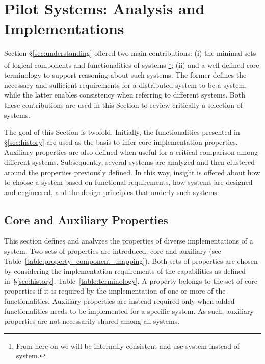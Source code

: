 \documentclass{sig-alternate}
\begin{document}
\section{Pilot Systems: Analysis and Implementations}
\label{sec:analysis}

Section \S\ref{sec:understanding} offered two main contributions: (i) the
minimal sets of logical components and functionalities of \pilot systems
\footnote{ From here on we will be internally consistent and use \pilot system
instead of \pilotjob system.}; (ii) and a well-defined core terminology to
support reasoning about such systems. The former defines the necessary and
sufficient requirements for a distributed system to be a \pilot system, while
the latter enables consistency when referring to different \pilot systems. Both
these contributions are used in this Section to review critically a selection
of \pilot systems.

The goal of this Section is twofold. Initially, the \pilot functionalities
presented in \S\ref{sec:history} are used as the basis to infer core \pilot
implementation properties. Auxiliary properties are also defined when useful
for a critical comparison among different \pilot systems. Subsequently, several
\pilot systems are analyzed and then clustered around the properties previously
defined. In this way, insight is offered about how to choose a \pilot system
based on functional requirements, how \pilot systems are designed and
engineered, and the design principles that underly such systems.

%
\subsection{Core and Auxiliary Properties}
\label{sec:properties}

This section defines and analyzes the properties of diverse implementations of
a \pilot system. Two sets of properties are introduced: core and auxiliary (see
Table~\ref{table:property_component_mapping}). Both sets of properties are
chosen by considering the implementation requirements of the \pilot
capabilities as defined in~\S\ref{sec:history}, Table~\ref{table:terminology}.
A property belongs to the set of core properties if it is required by the
implementation of one or more of the \pilot functionalities. Auxiliary
properties are instead required only when added functionalities needs to be
implemented for a specific \pilot system. As such, auxiliary properties are not
necessarily shared among all \pilot systems.
\end{document}
